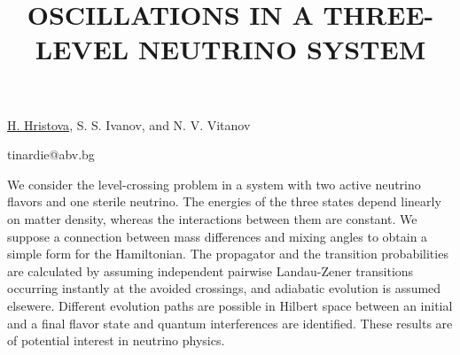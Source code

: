 \title{OSCILLATIONS IN A THREE-LEVEL NEUTRINO SYSTEM}

\underline{H. Hristova}, S. S. Ivanov, and N. V. Vitanov

{\normalsize{

\vspace{-4mm} \unisofia

\email tinardie@abv.bg}}

We consider the level-crossing problem in a system with two active neutrino flavors and one sterile neutrino. The energies of the three states depend linearly on matter density, whereas the interactions between them are constant. We suppose a connection between mass differences and mixing angles to obtain a simple form for the Hamiltonian. The propagator and the transition probabilities are calculated by assuming independent pairwise Landau-Zener transitions occurring instantly at the avoided crossings, and adiabatic evolution is assumed elsewere. Different evolution paths are possible in Hilbert space between an initial and a final flavor state and quantum interferences are identified. These results are of potential interest in neutrino physics.


\vspace{\baselineskip} 